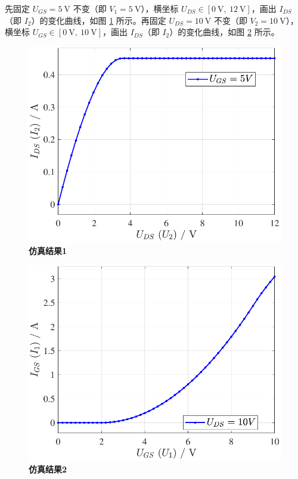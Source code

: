 \documentclass[UTF8]{report}
\theoremstyle{MyLineTheoremStyle} %
\theoremstyle{MyBlockTheoremStyle} %
\theoremstyle{MySubsubsectionStyle} %
\begin{document}
先固定 $U_{GS} = 5\ \mathrm{V}$ 不变（即 $V_1 = 5\ \mathrm{V}$），横坐标 $U_{DS} \in [0\ \mathrm{V},\ 12\ \mathrm{V}]$，画出 $I_{DS}$（即 $I_2$）的变化曲线，如图 \ref{仿真结果1} 所示。再固定 $U_{DS} = 10\ \mathrm{V}$ 不变（即 $V_2 = 10\ \mathrm{V}$），横坐标 $U_{GS} \in [0\ \mathrm{V},\ 10\ \mathrm{V}]$，画出 $I_{DS}$（即 $I_2$）的变化曲线，如图 \ref{仿真结果2} 所示。
\begin{center}
    \noindent\begin{minipage}{0.42\textwidth}
        \begin{figure}[H]\centering
        \includegraphics[width=\textwidth]{assets/1/2024-08-30_00-57-32.pdf}
        \caption{\textbf{仿真结果1}}\label{仿真结果1}
        \end{figure}
    \end{minipage}\hspace{5mm}
    \begin{minipage}{0.42\textwidth}
        \begin{figure}[H]\centering
        \includegraphics[width=\textwidth]{assets/1/2024-08-30_00-57-34.pdf}
    \caption{\textbf{仿真结果2}}\label{仿真结果2}
    \end{figure}
    \end{minipage}
\end{center}
\end{document}
